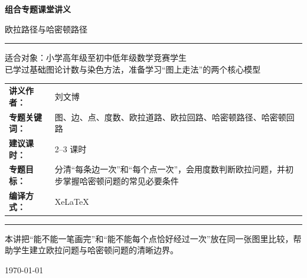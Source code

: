 \documentclass[11pt,a4paper,fontset=fandol]{ctexart}
\theoremstyle{formaltheorem}
\theoremstyle{formalexample}
\begin{document}
\thispagestyle{empty}
\begin{titlepage}
\centering
\vspace*{0.9cm}

\begin{tcolorbox}[
  enhanced,
  width=0.92\textwidth,
  colback=white,
  colframe=mainblue,
  boxrule=1pt,
  arc=0mm,
  left=6mm,
  right=6mm,
  top=8mm,
  bottom=8mm
]
\centering

{\fontsize{24}{30}\selectfont\bfseries 组合专题课堂讲义\par}
\vspace{0.7cm}
{\fontsize{17}{22}\selectfont 欧拉路径与哈密顿路径\par}

\vspace{1.1cm}
\color{rulegray}\rule{0.72\textwidth}{0.7pt}\par
\vspace{1cm}

\begin{tcolorbox}[colback=lightblue,colframe=mainblue,width=0.82\textwidth,boxrule=1pt]
\centering
{\Large 适合对象：小学高年级至初中低年级数学竞赛学生}\\[0.4em]
{\large 已学过基础图论计数与染色方法，准备学习“图上走法”的两个核心模型}
\end{tcolorbox}

\vspace{1.2cm}

\renewcommand{\arraystretch}{1.42}
\begin{tabular}{>{\bfseries}p{3.5cm}p{8cm}}
讲义作者： & 刘文博 \\
专题关键词： & 图、边、点、度数、欧拉道路、欧拉回路、哈密顿路径、哈密顿回路 \\
建议课时： & 2--3 课时 \\
专题目标： & 分清“每条边一次”和“每个点一次”，会用度数判断欧拉问题，并初步掌握哈密顿问题的常见必要条件 \\
编译方式： & XeLaTeX \\
\end{tabular}

\vspace{1.2cm}
\color{rulegray}\rule{0.72\textwidth}{0.7pt}\par
\vspace{0.8cm}

{\normalsize 本讲把“能不能一笔画完”和“能不能每个点恰好经过一次”放在同一张图里比较，帮助学生建立欧拉问题与哈密顿问题的清晰边界。\par}

\vspace{0.5cm}
{\large \today\par}
\end{tcolorbox}
\end{titlepage}
\end{document}
